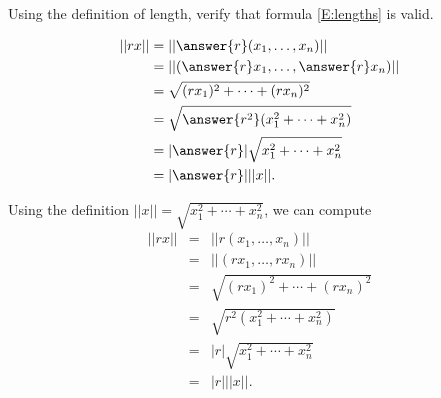 \documentclass{ximera}
\begin{document}
\begin{exercise}  \label{c1.4.9A}
Using the definition of length, verify that formula \eqref{E:lengths} 
is valid.
\begin{prompt}
\begin{align*}
||rx|| & = ||\answer{r}(x_1,\dots,x_n)|| \\
& = ||(\answer{r}x_1,\dots,\answer{r}x_n)|| \\
& = \sqrt{(rx_1)^2 + \cdots + (rx_n)^2} \\
& = \sqrt{ \answer{r^2} (x_1^2 + \cdots + x_n^2)} \\
& = |\answer{r}|\sqrt{x_1^2 + \cdots + x_n^2} \\
& = |\answer{r}| ||x||.
\end{align*}
\end{prompt}

\begin{solution}
Using the definition $||x|| = \sqrt{x_1^2 + \cdots + x_n^2}$,
we can compute
\[
\begin{array}{rcl}
||rx|| & = & ||r(x_1,\dots,x_n)|| \\
& = & ||(rx_1,\dots,rx_n)|| \\
& = & \sqrt{(rx_1)^2 + \cdots + (rx_n)^2} \\
& = & \sqrt{r^2(x_1^2 + \cdots + x_n^2)} \\
& = & |r|\sqrt{x_1^2 + \cdots + x_n^2} \\
& = & |r| ||x||.
\end{array}
\]


\end{solution}
\end{exercise}
\end{document}
